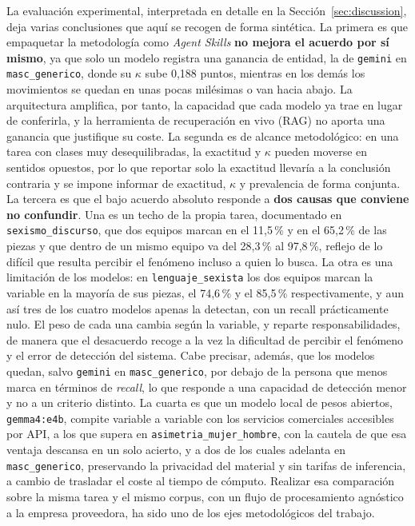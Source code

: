 La evaluación experimental, interpretada en detalle en la Sección~\ref{sec:discussion},
deja varias conclusiones que aquí se recogen de forma sintética. La primera es que
empaquetar la metodología como \textit{Agent Skills} \textbf{no mejora el acuerdo por
sí mismo}, ya que solo un modelo registra una ganancia de entidad, la de
\texttt{gemini} en \texttt{masc\_generico}, donde su $\kappa$ sube 0,188 puntos,
mientras en los demás los movimientos se quedan en unas pocas milésimas o van hacia
abajo. La arquitectura amplifica, por tanto, la capacidad que cada modelo ya trae en
lugar de conferirla, y la herramienta de recuperación en vivo (RAG) no aporta una
ganancia que justifique su coste. La segunda es de alcance metodológico: en una tarea con
clases muy desequilibradas, la exactitud y $\kappa$ pueden moverse en sentidos opuestos,
por lo que reportar solo la exactitud llevaría a la conclusión contraria y se impone
informar de exactitud, $\kappa$ y prevalencia de forma conjunta. La tercera es que el
bajo acuerdo absoluto responde a \textbf{dos causas que conviene no confundir}. Una es
un techo de la propia tarea, documentado en \texttt{sexismo\_discurso}, que dos equipos
marcan en el 11,5\,\% y en el 65,2\,\% de las piezas y que dentro de un mismo equipo va
del 28,3\,\% al 97,8\,\%, reflejo de lo difícil que resulta percibir el fenómeno incluso
a quien lo busca. La otra es una limitación de los modelos: en \texttt{lenguaje\_sexista} los dos
equipos marcan la variable en la mayoría de sus piezas, el 74,6\,\% y el 85,5\,\%
respectivamente, y aun así tres de los cuatro modelos apenas la detectan, con un
recall prácticamente nulo. El peso de cada una cambia según la variable, y reparte responsabilidades, de
manera que el desacuerdo recoge a la vez la dificultad de percibir el fenómeno y el
error de detección del sistema. Cabe
precisar, además, que los modelos quedan, salvo \texttt{gemini} en
\texttt{masc\_generico}, por debajo de la persona que menos marca en términos de \textit{recall}, lo que responde a
una capacidad de detección menor y no a un criterio distinto. La cuarta es que un modelo local
de pesos abiertos, \texttt{gemma4:e4b}, compite variable a variable con los servicios
comerciales accesibles por API, a los que supera en \texttt{asimetria\_mujer\_hombre}, con la cautela de que esa
ventaja descansa en un solo acierto, y a dos de los cuales adelanta en
\texttt{masc\_generico}, preservando la privacidad del material y sin
tarifas de inferencia, a cambio de trasladar el coste al tiempo de cómputo. Realizar esa comparación sobre la misma tarea y el mismo corpus, con un flujo de procesamiento agnóstico a la
empresa proveedora, ha sido uno de los ejes metodológicos del trabajo.

